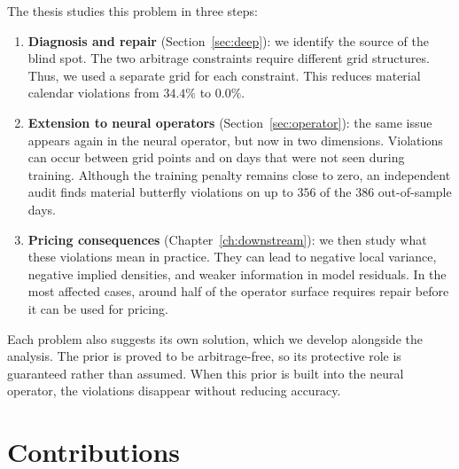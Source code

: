 The thesis studies this problem in three steps:

\begin{enumerate}

    \item \textbf{Diagnosis and repair} (Section~\ref{sec:deep}): we identify the source of the blind spot. The two arbitrage constraints require different grid structures. Thus, we used a separate grid for each constraint. This reduces material calendar violations from $34.4\%$ to $0.0\%$.
    
    \item \textbf{Extension to neural operators} (Section~\ref{sec:operator}): the same issue appears again in the neural operator, but now in two dimensions. Violations can occur between grid points and on days that were not seen during training. Although the training penalty remains close to zero, an independent audit finds material butterfly violations on up to $356$ of the $386$ out-of-sample days.
    
    \item \textbf{Pricing consequences} (Chapter~\ref{ch:downstream}): we then study what these violations mean in practice. They can lead to negative local variance, negative implied densities, and weaker information in model residuals. In the most affected cases, around half of the operator surface requires repair before it can be used for pricing.

\end{enumerate}

Each problem also suggests its own solution, which we develop alongside the analysis. The prior is proved to be arbitrage-free, so its protective role is guaranteed rather than assumed. When this prior is built into the neural operator, the violations disappear without reducing accuracy.


\section{Contributions}


